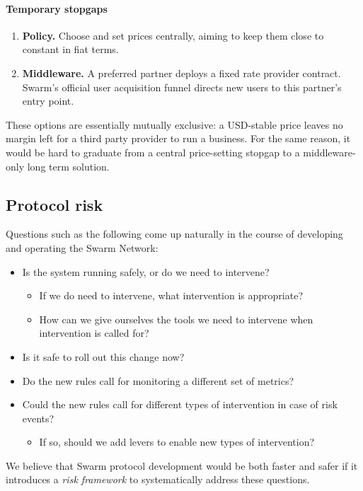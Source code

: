 \paragraph{Temporary stopgaps}

\begin{enumerate}
  \item \textbf{Policy.} Choose and set prices centrally, aiming to keep them close to constant in fiat terms.
  \item \textbf{Middleware.} A preferred partner deploys a fixed rate provider contract. Swarm's official user acquisition funnel directs new users to this partner's entry point.
\end{enumerate}

These options are essentially mutually exclusive: a USD-stable price leaves no margin left for a third party provider to run a business.
%
For the same reason, it would be hard to graduate from a central price-setting stopgap to a middleware-only long term solution.

\subsection*{Protocol risk}

Questions such as the following come up naturally in the course of developing and operating the Swarm Network:
%
\begin{itemize}
  \item Is the system running safely, or do we need to intervene?
  \begin{itemize}
    \item If we do need to intervene, what intervention is appropriate?
    \item How can we give ourselves the tools we need to intervene when intervention is called for?
  \end{itemize}
  \item Is it safe to roll out this change now?
  \item Do the new rules call for monitoring a different set of metrics?
  \item Could the new rules call for different types of intervention in case of risk events?
  \begin{itemize}
    \item If so, should we add levers to enable new types of intervention?
  \end{itemize}
\end{itemize}
%
We believe that Swarm protocol development would be both faster and safer if it introduces a \emph{risk framework} to systematically address these questions.

